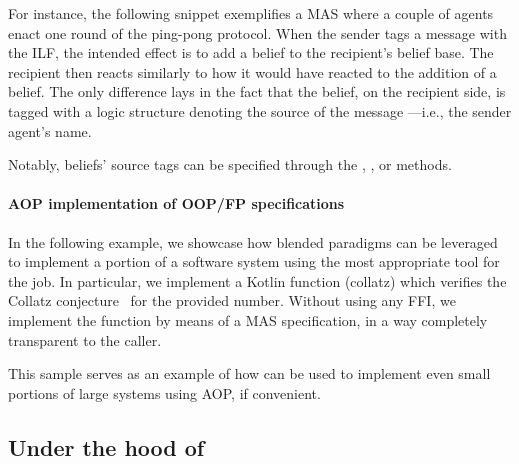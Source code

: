 For instance, the following snippet exemplifies a \ac{MAS} where a couple of agents
enact one round of the ping-pong protocol.
%
When the sender tags a message with the  ILF,
the intended effect is to add a belief to the recipient's belief base.
%
The recipient then reacts similarly to how it would have reacted to the addition of a belief.
%
The only difference lays in the fact that the belief, on the recipient side,
is tagged with a logic structure denoting the source of the message%
---i.e., the sender agent's name.
%

%
Notably, beliefs' source tags can be specified through the
,
,
or  methods.

\paragraph{\ac{AOP} implementation of \ac{OOP}/\ac{FP} specifications}

In the following example,
we showcase how blended paradigms can be leveraged to implement a portion of a software system
using the most appropriate tool for the job.
%
In particular, we implement a Kotlin function \kotlinInline(collatz) which
verifies the Collatz conjecture~\cite{collatz} for the provided number.
%
Without using any \ac{FFI},
we implement the function by means of a \ac{MAS} specification,
in a way completely transparent to the caller.
%

%
This sample serves as an example of how \jakta{} can be used to implement
even small portions of large systems using \ac{AOP}, if convenient.



\subsection{Under the hood of \jakta{}}
\label{sec:implementation}

